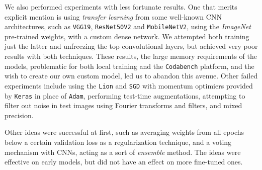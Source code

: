 \documentclass[11pt]{article}
\begin{document}
\begin{multicols}{2}
      We also performed experiments with less fortunate results. One that merits explicit mention is using \textit{transfer learning}\cite{TransferLearning} from some well-known CNN architectures, such as \texttt{VGG19}, \texttt{ResNet50V2} and \texttt{MobileNetV2}, using the \textit{ImageNet}\cite{ImageNet} pre-trained weights, with a custom dense network. We attempted both training just the latter and unfreezing the top convolutional layers, but achieved very poor results with both techniques. These results, the large memory requirements of the models, problematic for both local training and the \texttt{Codabench} platform, and the wish to create our own custom model, led us to abandon this avenue. Other failed experiments include using the \texttt{Lion} and \texttt{SGD} with momentum optimiers provided by \texttt{Keras} in place of \texttt{Adam}, performing test-time augmentations, attempting to filter out noise in test images using Fourier transforms and filters, and mixed precision.

      Other ideas were successful at first, such as averaging weights from all epochs below a certain validation loss as a regularization technique, and a voting mechanism with CNNs, acting as a sort of \textit{ensemble} method. The ideas were effective on early models, but did not have an effect on more fine-tuned ones.




\end{multicols}
\end{document}
